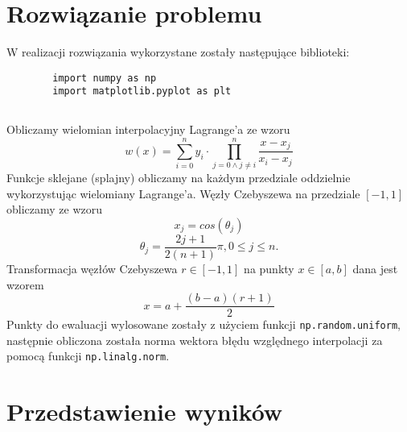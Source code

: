 \documentclass[11pt]{scrartcl}
\begin{document}
    \section{Rozwiązanie problemu}
    W realizacji rozwiązania wykorzystane zostały następujące
    biblioteki:
    \begin{lstlisting}
        import numpy as np
        import matplotlib.pyplot as plt
    \end{lstlisting}

    \subsection*{}
    Obliczamy wielomian interpolacyjny Lagrange'a ze wzoru
    \[
        w(x)=\sum_{i=0}^{n}y_i \cdot \prod_{j=0 \land j \neq i}^{n}
        \frac{x-x_j}{x_i-x_j}
    \]
    Funkcje sklejane (splajny) obliczamy na każdym przedziale
    oddzielnie wykorzystując wielomiany Lagrange'a. Węzły
    Czebyszewa na przedziale $[-1,1]$ obliczamy ze wzoru
    \[
        x_j=cos(\theta_j)
    \]
    \[
        \theta_j=\frac{2j+1}{2(n+1)}\pi, 0 \leq j \leq n.
    \]
    Transformacja węzłów Czebyszewa $r \in [-1,1]$ na punkty
    $x \in [a,b]$ dana jest wzorem
    \[
        x=a+ \frac{(b-a)(r+1)}{2}
    \]
    Punkty do ewaluacji wylosowane zostały z użyciem funkcji
    \texttt{np.random.uniform}, następnie obliczona została norma
    wektora błędu względnego interpolacji za pomocą funkcji
    \texttt{np.linalg.norm}.
    
    \section{Przedstawienie wyników}
\end{document}
